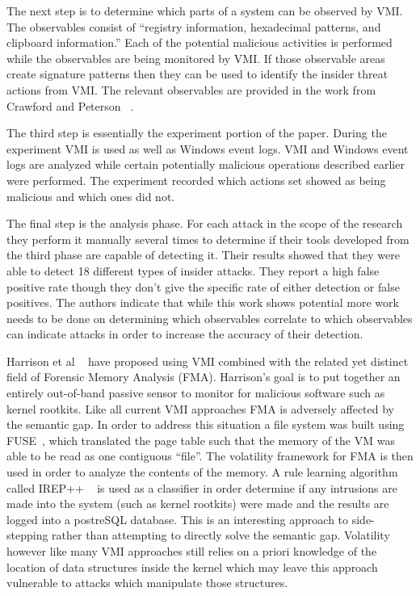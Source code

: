 The next step is to determine which parts of a system can be observed by VMI. The observables consist of ``registry information, hexadecimal patterns, and clipboard information.'' Each of the potential malicious activities is performed while the observables are being monitored by VMI. If those observable areas create signature patterns then they can be used to identify the insider threat actions from VMI. The relevant observables are provided in the work from Crawford and Peterson ~\cite{crawford_insider_2013}. 

The third step is essentially the experiment portion of the paper. During the experiment VMI is used as well as Windows event logs. VMI and Windows event logs are analyzed while certain potentially malicious operations described earlier were performed. The experiment recorded which actions set showed as being malicious and which ones did not. 

The final step is the analysis phase. For each attack in the scope of the research they perform it manually several times to determine if their tools developed from the third phase are capable of detecting it. Their results showed that they were able to detect 18 different types of insider attacks. They report a high false positive rate though they don’t give the specific rate of either detection or false positives. The authors indicate that while this work shows potential more work needs to be done on determining which observables correlate to which observables can indicate attacks in order to increase the accuracy of their detection. 

Harrison et al ~\cite{harrison_constructing_2012} have proposed using VMI combined with the related yet distinct field of Forensic Memory Analysis (FMA). Harrison’s goal is to put together an entirely out-of-band passive sensor to monitor for malicious software such as kernel rootkits. Like all current VMI approaches FMA is adversely affected by the semantic gap. In order to address this situation a file system was built using FUSE~\cite{rajgarhia_performance_2010}, which translated the page table such that the memory of the VM was able to be read as one contiguous “file”. The volatility framework for FMA is then used in order to analyze the contents of the memory. A rule learning algorithm called IREP++ ~\cite{dain_irep_2004} is used as a classifier in order determine if any intrusions are made into the system (such as kernel rootkits) were made and the results are logged into a postreSQL database. This is an interesting approach to side-stepping rather than attempting to directly solve the semantic gap. Volatility however like many VMI approaches still relies on a priori knowledge of the location of data structures inside the kernel which may leave this approach vulnerable to attacks which manipulate those structures. 

